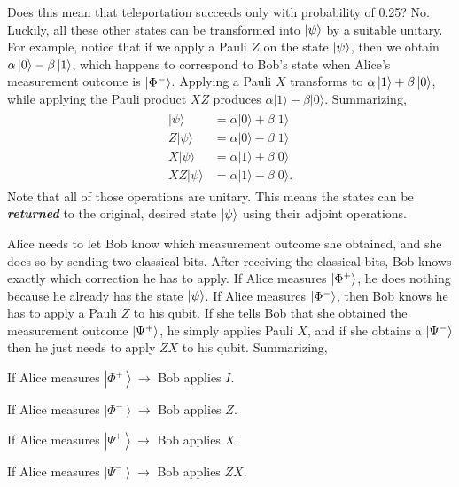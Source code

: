 Does this mean that teleportation succeeds only with probability of 0.25?
No.
Luckily, all these other states can be transformed into $\left| \psi \right\rangle$ by a suitable unitary.
For example, notice that if we apply a Pauli $Z$ on the state $\left| \psi \right\rangle$, then we obtain $\alpha\left| 0 \right\rangle-\beta\left| 1 \right\rangle$, which happens to correspond to Bob's state when Alice's measurement outcome is $\left| \Phi^- \right\rangle$.
Applying a Pauli $X$ transforms \ket{\psi} to $\alpha\left| 1 \right\rangle+\beta\left| 0 \right\rangle$, while applying the Pauli product $XZ$ produces $\alpha|1\rangle-\beta|0\rangle$.
Summarizing,
\begin{align}
\begin{aligned}
    |\psi\rangle &=\alpha|0\rangle+\beta|1\rangle \\
    Z|\psi\rangle &=\alpha|0\rangle-\beta|1\rangle \\
    X|\psi\rangle &=\alpha|1\rangle+\beta|0\rangle \\
    X Z|\psi\rangle &=\alpha|1\rangle-\beta|0\rangle.
    \label{eq:teleportation_possible_states}
\end{aligned}
\end{align}
Note that all of those operations are unitary.  This means the states can be \textbf{\emph{returned}} to the original, desired state $\left| \psi \right\rangle$ using their adjoint operations.

Alice needs to let Bob know which measurement outcome she obtained, and she does so by sending two classical bits.
After receiving the classical bits, Bob knows exactly which correction he has to apply.
If Alice measures $\left| \Phi^+ \right\rangle$, he does nothing because he already has the state $\left| \psi \right\rangle$.
If Alice measures $\left| \Phi^- \right\rangle$, then Bob knows he has to apply a Pauli $Z$ to his qubit.
If she tells Bob that she obtained the measurement outcome $\left| \Psi^+ \right\rangle$, he simply applies Pauli $X$, and if she obtains a $\left| \Psi^- \right\rangle$ then he just needs to apply $ZX$ to his qubit.  Summarizing,

\hspace{2cm} If Alice measures $\left|\Phi^{+}\right\rangle \rightarrow$ Bob applies $I$.

\hspace{2cm} If Alice measures $\left|\Phi^{-}\right\rangle \rightarrow$ Bob applies $Z$.

\hspace{2cm} If Alice measures $\left|\Psi^{+}\right\rangle \rightarrow$ Bob applies $X$.

\hspace{2cm} If Alice measures $\left|\Psi^{-}\right\rangle \rightarrow$ Bob applies $Z X$.

